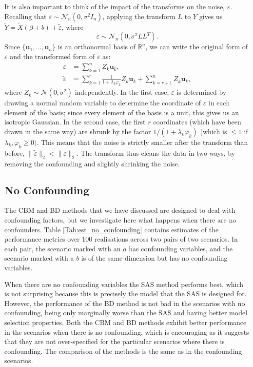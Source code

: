 \documentclass[11pt]{article}
\newcommand{\eps}{\varepsilon}
\newcommand{\R}{\mathbb{R}}
\newcommand{\N}{\mathcal{N}}
\numberwithin{equation}{section}
\begin{document}
It is also important to think of the impact of the transforms on the noise, $\eps$. Recalling that $\eps \sim \N_n(0, \sigma^2 I_n)$, applying the transform $L$ to $Y$ gives us $\tilde Y = \tilde{X} (\beta + b) + \tilde{\eps}$, where
$$
\tilde{\eps} \sim \N_n(0, \sigma^2 LL^T ).
$$
Since $\{\mathbf{u}_1, \dots, \mathbf{u}_n\}$ is an orthonormal basis of $\R^n$, we can write the original form of $\eps$ and the transformed form of $\tilde{\eps}$ as:
\begin{align*}
	\eps &= \sum_{k = 1}^n Z_k\mathbf{u}_k, \\
	\tilde{\eps} &= \sum_{k = 1}^r \frac{1}{1+\lambda_k \varphi_k} Z_k \mathbf{u}_k + \sum_{k = r + 1}^n Z_k \mathbf{u}_k,
\end{align*}
where $Z_k \sim \N(0, \sigma^2)$ independently. In the first case, $\eps$ is determined by drawing a normal random variable to determine the coordinate of $\eps$ in each element of the basis; since every element of the basis is a unit, this gives us an isotropic Gaussian. In the second case, the first $r$ coordinates (which have been drawn in the same way) are shrunk by the factor $1/(1+\lambda_k \varphi_k)$ (which is $\leq 1$ if $\lambda_k, \varphi_k \geq 0)$. This means that the noise is strictly smaller after the transform than before, $\|\tilde{\eps}\|_2 < \|\eps\|_2$. The transform thus cleans the data in two ways, by removing the confounding and slightly shrinking the noise.

\subsection{No Confounding}
The CBM and BD methods that we have discussed are designed to deal with confounding factors, but we investigate here what happens when there are no confounders. Table \ref{Tab:est_no_confounding} contains estimates of the performance metrics over 100 realisations across two pairs of two scenarios. In each pair, the scenario marked with an $a$ has confounding variables, and the scenario marked with a $b$ is of the same dimension but has no confounding variables. 

When there are no confounding variables the SAS method performs best, which is not surprising because this is precisely the model that the SAS is designed for. However, the performance of the BD method is not bad in the scenarios with no confounding, being only marginally worse than the SAS and having better model selection properties. Both the CBM and BD methods exhibit better performance in the scenarios when there is no confounding, which is encouraging as it suggests that they are not over-specified for the particular scenarios where there is confounding. The comparison of the methods is the same as in the confounding scenarios.
\end{document}
